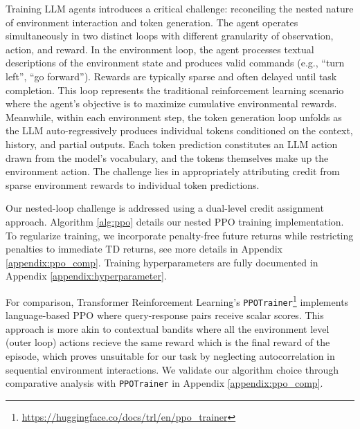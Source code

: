 \documentclass[11pt,a4paper]{article}
\begin{document}
Training LLM agents introduces a critical challenge: reconciling the nested nature of environment interaction and token generation. 
The agent operates simultaneously in two distinct loops with different granularity of observation, action, and reward. 
In the environment loop, the agent processes textual descriptions of the environment state and produces valid commands (e.g., ``turn left'', ``go forward''). 
Rewards are typically sparse and often delayed until task completion. 
This loop represents the traditional reinforcement learning scenario where the agent's objective is to maximize cumulative environmental rewards. 
Meanwhile, within each environment step, the token generation loop unfolds as the LLM auto-regressively produces individual tokens conditioned on the context, history, and partial outputs. 
Each token prediction constitutes an LLM action drawn from the model's vocabulary, and the tokens themselves make up the environment action.
The challenge lies in appropriately attributing credit from sparse environment rewards to individual token predictions.

Our nested-loop challenge is addressed using a dual-level credit assignment approach. Algorithm \ref{alg:ppo} details our nested PPO training implementation. To regularize training, we incorporate penalty-free future returns while restricting penalties to immediate TD returns, see more details in Appendix \ref{appendix:ppo_comp}. Training hyperparameters are fully documented in Appendix \ref{appendix:hyperparameter}.

For comparison, Transformer Reinforcement Learning's \texttt{PPOTrainer}\footnote{\url{https://huggingface.co/docs/trl/en/ppo\_trainer}} implements language-based PPO where query-response pairs receive scalar scores. This approach is more akin to contextual bandits where all the environment level (outer loop) actions recieve the same reward which is the final reward of the episode, which proves unsuitable for our task by neglecting autocorrelation in sequential environment interactions. We validate our algorithm choice through comparative analysis with \texttt{PPOTrainer} in Appendix \ref{appendix:ppo_comp}. 
\end{document}
